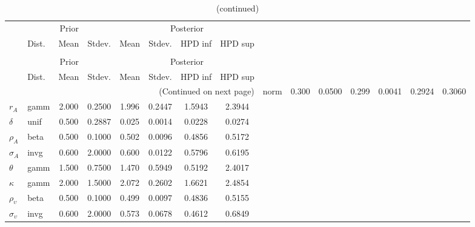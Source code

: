  
\begin{center}
\begin{longtable}{llcccccc} 
\caption{Results from Metropolis-Hastings (parameters)}
 \label{Table:MHPosterior:1}\\
\toprule 
  & \multicolumn{3}{c}{Prior}  &  \multicolumn{4}{c}{Posterior} \\
  \cmidrule(r{.75em}){2-4} \cmidrule(r{.75em}){5-8}
  & Dist. & Mean  & Stdev. & Mean & Stdev. & HPD inf & HPD sup\\
\midrule \endfirsthead 
\caption{(continued)}\\\toprule 
  & \multicolumn{3}{c}{Prior}  &  \multicolumn{4}{c}{Posterior} \\
  \cmidrule(r{.75em}){2-4} \cmidrule(r{.75em}){5-8}
  & Dist. & Mean  & Stdev. & Mean & Stdev. & HPD inf & HPD sup\\
\midrule \endhead 
\bottomrule \multicolumn{8}{r}{(Continued on next page)} \endfoot 
\bottomrule \endlastfoot 
${\alpha}$ & norm &   0.300 & 0.0500 &   0.299& 0.0041 &  0.2924 &  0.3060 \\ 
${r_{A}}$ & gamm &   2.000 & 0.2500 &   1.996& 0.2447 &  1.5943 &  2.3944 \\ 
${\delta}$ & unif &   0.500 & 0.2887 &   0.025& 0.0014 &  0.0228 &  0.0274 \\ 
${\rho_A}$ & beta &   0.500 & 0.1000 &   0.502& 0.0096 &  0.4856 &  0.5172 \\ 
${\sigma_A}$ & invg &   0.600 & 2.0000 &   0.600& 0.0122 &  0.5796 &  0.6195 \\ 
${\theta}$ & gamm &   1.500 & 0.7500 &   1.470& 0.5949 &  0.5192 &  2.4017 \\ 
${\kappa}$ & gamm &   2.000 & 1.5000 &   2.072& 0.2602 &  1.6621 &  2.4854 \\ 
${\rho_\upsilon}$ & beta &   0.500 & 0.1000 &   0.499& 0.0097 &  0.4836 &  0.5155 \\ 
${\sigma_\upsilon}$ & invg &   0.600 & 2.0000 &   0.573& 0.0678 &  0.4612 &  0.6849 \\ 
\end{longtable}
 \end{center}
